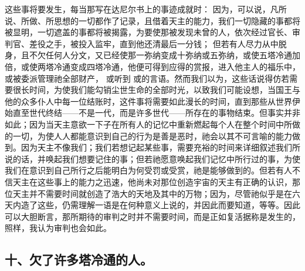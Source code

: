这些事将要发生，每当那写在达尼尔书上的事迹成就时： 因为，可以说，凡所说、所做、所思想的一切都作了记录，且借着天主的能力，我们一切隐藏的事都将被显明，一切遮盖的事都将被揭露，为要使那被发现未曾的人，依次经过官长、审判官、差役之手，被投入监牢，直到他还清最后一分钱； 但若有人尽力从中脱身，且不欠任何人分文，又已经使那一弥纳变成十弥纳或五弥纳，或使五塔冷通加倍，或使两塔冷通变成四塔冷通，他便可得到应得的赏报，进入他主人的福乐中，或被委派管理祂全部财产， 或听到  或的言语。然而我们以为，这些话说得仿若需要很长时间，为使我们能勾销尘世生命的全部时光，以致我们可能设想，当国王与他的众多仆人中每一位结账时，这件事将需要如此漫长的时间，直到那些从世界伊始直至世代终结——不是一代，而是许多世代——所存在的事物结束。但事实并非如此；因为当天主意欲一下子在所有人的记忆中重新燃起每个人在整个时间中所做的一切，为使人人都能意识到自己的行为是善是恶时，祂会以其不可言喻的能力做到。因为天主不像我们；我们若想记起某些事，需要充裕的时间来详细叙述我们所说的话，并唤起我们想要记住的事；但若祂愿意唤起我们记忆中所行过的事，为使我们在意识到自己所行之后能明白为何受罚或受赏，祂是能够做到的。但若有人不信天主在这些事上的能力之迅速，他尚未对那位创造宇宙的天主有正确的认识，那位天主并不需要时间就创造了浩大的天地及其中的万物；因为，尽管祂似乎是在六天内造了这些，仍需理解一语是在何种意义上说的，并因此而要知道，等等。因此可以大胆断言，那所期待的审判之时并不需要时间，而是正如复活据称是发生的，照样，我认为审判也会如此。\par


\subsection{十、欠了许多塔冷通的人。}

